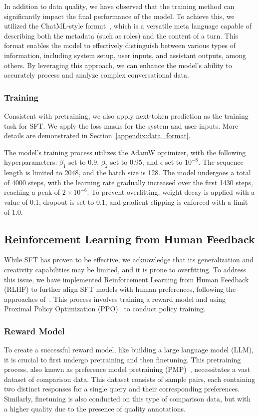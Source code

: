 In addition to data quality, we have observed that the training method can significantly impact the final performance of the model. To achieve this, we utilized the ChatML-style format~\citep{chatml}, which is a versatile meta language capable of describing both the metadata (such as roles) and the content of a turn. This format enables the model to effectively distinguish between various types of information, including system setup, user inputs, and assistant outputs, among others. By leveraging this approach, we can enhance the model's ability to accurately process and analyze complex conversational data.

\subsubsection{Training}
Consistent with pretraining, we also apply next-token prediction as the training task for SFT. We apply the loss masks for the system and user inputs. More details are demonstrated in Section~\ref{appendix:data_format}. 

The model's training process utilizes the AdamW optimizer, with the following hyperparameters: $\beta_1$ set to \num{0.9}, $\beta_2$ set to \num{0.95},  and $\epsilon$ set to $10^{-8}$. The sequence length is limited to \num{2048}, and the batch size is \num{128}.
The model undergoes a total of \num{4000} steps,  with the learning rate gradually increased over the first \num{1430} steps, reaching a peak of $2 \times 10^{-6}$. To prevent overfitting, weight decay is applied with a value of \num{0.1}, dropout is set to \num{0.1}, and gradient clipping is enforced with a limit of \num{1.0}.

\subsection{Reinforcement Learning from Human Feedback}

While SFT has proven to be effective, we acknowledge that its generalization and creativity capabilities may be limited, and it is prone to overfitting. To address this issue, we have implemented Reinforcement Learning from Human Feedback (RLHF) to further align SFT models with human preferences, following the approaches of~\citet{instructgpt, rlhf}. This process involves training a reward model and using Proximal Policy Optimization (PPO)~\citep{ppo} to conduct policy training.

\subsubsection{Reward Model} To create a successful reward model, like building a large language model (LLM), it is crucial to first undergo pretraining and then finetuning. This pretraining process, also known as preference model pretraining (PMP)~\citep{PMP}, necessitates a vast dataset of comparison data. This dataset consists of sample pairs, each containing two distinct responses for a single query and their corresponding preferences. Similarly, finetuning is also conducted on this type of comparison data, but with a higher quality due to the presence of quality annotations.

